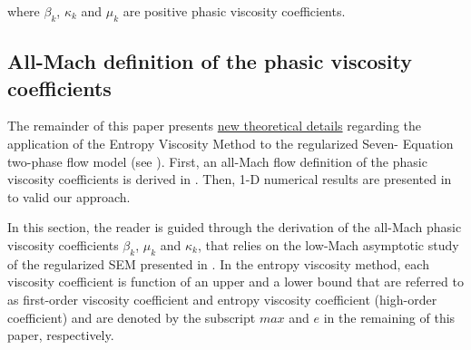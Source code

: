 \documentclass[preprint,10pt]{elsarticle}
\begin{document}
%
where $\beta_k$, $\kappa_k$ and $\mu_k$ are positive phasic viscosity coefficients. 

%
\subsection{All-Mach definition of the phasic viscosity coefficients}\label{sec:visc-def}
%
 

%
The remainder of this paper presents \underline{new theoretical details} regarding the application of the Entropy Viscosity Method to the regularized Seven-
Equation two-phase flow model (see ). 
First, an all-Mach flow definition of the phasic viscosity coefficients is derived in . Then, 1-D numerical results are presented in 
 to valid our approach.

In this section, the reader is guided through the derivation of the all-Mach phasic viscosity coefficients $\beta_k$, $\mu_k$ and $\kappa_k$, that relies on the 
low-Mach asymptotic study of the regularized SEM 
presented in \cite{Marco_paper_sem}. In the entropy viscosity method, each viscosity coefficient is function of an upper and a lower bound that are referred to as first-order 
viscosity coefficient and entropy viscosity coefficient (high-order coefficient) 
and are denoted by the subscript $max$ and $e$ in the remaining of this paper, respectively. 
%
\end{document}
